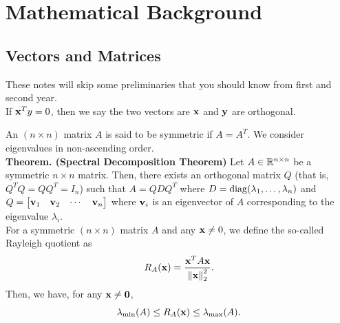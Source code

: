 \chapter{Mathematical Background}

\section{Vectors and Matrices}

These notes will skip some preliminaries that you should know from first and second year. \\

If \(\mathbf{x}^T y = 0\), then we say the two vectors are \(\mathbf{x}\) and \(\mathbf{y}\) are orthogonal.


An \((n \times n)\) matrix \(A\) is said to be symmetric if \(A = A^T\). We consider eigenvalues in non-ascending order. \\

\textbf{Theorem. (Spectral Decomposition Theorem)}
Let \(A \in \mathbb{R}^{n \times n}\) be a symmetric \(n \times n\) matrix. Then, there exists an orthogonal matrix \(Q\) (that is, \(Q^TQ = QQ^T = I_n\)) such that \(A = QDQ^T\) where \(D = \operatorname{diag}(\lambda_1, \dots, \lambda_n)\) and \(Q = \begin{bmatrix}
    \mathbf{v}_1 & \mathbf{v}_2 & \cdots & \mathbf{v}_n
\end{bmatrix}\) where \(\mathbf{v}_i\) is an eigenvector of \(A\) corresponding to the eigenvalue \(\lambda_i\). \\

For a symmetric \((n \times n)\) matrix \(A\) and any \(\mathbf{x} \neq 0\), we define the so-called Rayleigh quotient as
\[R_A(\mathbf{x}) = \frac{\mathbf{x}^T A\mathbf{x}}{\norm{\mathbf{x}}_2^2}.\]
Then, we have, for any \(\mathbf{x} \neq \mathbf{0}\),
\[\lambda_{\min}(A) \leq R_A(\mathbf{x}) \leq \lambda_{\max}(A).\]

